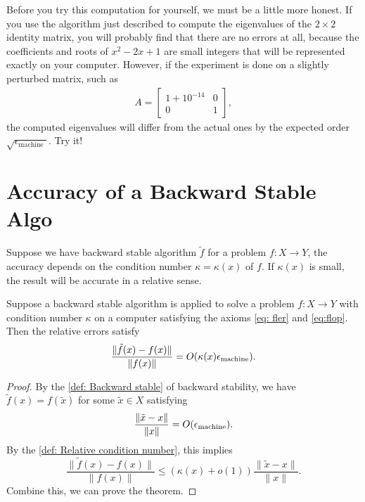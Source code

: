 Before you try this computation for yourself, we must be a little more honest. If you use the algorithm just described to compute the eigenvalues of the $2 \times 2$ identity matrix, you will probably find that there are no errors at all, because the coefficients and roots of $x^2-2 x+1$ are small integers that will be represented exactly on your computer. However, if the experiment is done on a slightly perturbed matrix, such as
\begin{align*}
A=\left[\begin{array}{cc}
1+10^{-14} & 0 \\
0 & 1
\end{array}\right],
\end{align*}
the computed eigenvalues will differ from the actual ones by the expected order $\sqrt{\epsilon_{\text {machine }}}$. Try it!

\section{Accuracy of a Backward Stable Algo} 
Suppose we have backward stable algorithm $\tilde f$ for a problem $f: X\to Y$, the accuracy depends on the condition number $\kappa=\kappa(x)$ of $f$. If $\kappa(x)$ is small, the result will be accurate in a relative sense.  


\begin{theorem}
\label{thm: Accuracy of a back stap algo}
Suppose a backward stable algorithm is applied to solve a problem $f:X\to Y$ with condition number $\kappa$ on a computer satisfying the axioms \eqref{eq: fler} and \eqref{eq:flop}. Then the relative errors satisfy 
\begin{equation}
    \label{eq: Acc of a back stap algo} 
    \frac{\|\tilde f(x) - f(x)\|}{\|f(x)\|} = O(\kappa(x) \epsilon_{\text{machine}}). 
\end{equation}
\end{theorem}

\begin{proof}
By the \autoref{def: Backward stable} of backward stability, we have $\tilde f(x) = f(\tilde x)$ for some $\tilde x\in X$ satisfying 
\[
    \frac{\|\tilde x - x\|}{\|x\|} = O(\epsilon_{\text{machine}}). 
\]
By the \autoref{def: Relative condition number}, this implies 
\[
    \frac{\|\tilde f(x) - f(x)\|}{\|f(x)\|} \le (\kappa(x) +o(1)) \frac{\|\tilde x - x\|}{\|x\|}. 
\]
Combine this, we can prove the theorem. 
\end{proof}
 
